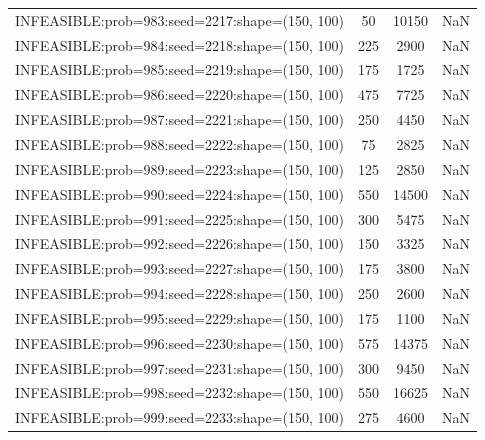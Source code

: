 \begin{longtable}{lccc}
INFEASIBLE:prob=983:seed=2217:shape=(150, 100) &       50 & 10150 &    NaN \\
INFEASIBLE:prob=984:seed=2218:shape=(150, 100) &      225 &  2900 &    NaN \\
INFEASIBLE:prob=985:seed=2219:shape=(150, 100) &      175 &  1725 &    NaN \\
INFEASIBLE:prob=986:seed=2220:shape=(150, 100) &      475 &  7725 &    NaN \\
INFEASIBLE:prob=987:seed=2221:shape=(150, 100) &      250 &  4450 &    NaN \\
INFEASIBLE:prob=988:seed=2222:shape=(150, 100) &       75 &  2825 &    NaN \\
INFEASIBLE:prob=989:seed=2223:shape=(150, 100) &      125 &  2850 &    NaN \\
INFEASIBLE:prob=990:seed=2224:shape=(150, 100) &      550 & 14500 &    NaN \\
INFEASIBLE:prob=991:seed=2225:shape=(150, 100) &      300 &  5475 &    NaN \\
INFEASIBLE:prob=992:seed=2226:shape=(150, 100) &      150 &  3325 &    NaN \\
INFEASIBLE:prob=993:seed=2227:shape=(150, 100) &      175 &  3800 &    NaN \\
INFEASIBLE:prob=994:seed=2228:shape=(150, 100) &      250 &  2600 &    NaN \\
INFEASIBLE:prob=995:seed=2229:shape=(150, 100) &      175 &  1100 &    NaN \\
INFEASIBLE:prob=996:seed=2230:shape=(150, 100) &      575 & 14375 &    NaN \\
INFEASIBLE:prob=997:seed=2231:shape=(150, 100) &      300 &  9450 &    NaN \\
INFEASIBLE:prob=998:seed=2232:shape=(150, 100) &      550 & 16625 &    NaN \\
INFEASIBLE:prob=999:seed=2233:shape=(150, 100) &      275 &  4600 &    NaN \\
\end{longtable}
